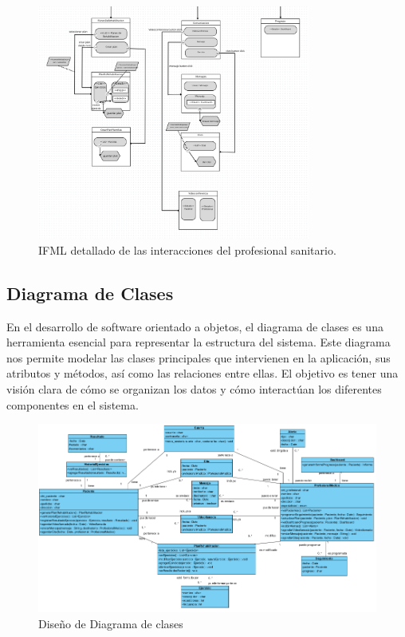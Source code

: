 \documentclass{article}
\begin{document}
\begin{figure}[H]
	\centering
	\includegraphics[width=0.8\textwidth]{images/ifml_profesional.png}
	\caption{IFML detallado de las interacciones del profesional sanitario.}
	\label{fig:ifml_profesional}
\end{figure}


\subsection{Diagrama de Clases}

En el desarrollo de software orientado a objetos, el diagrama de clases es una herramienta esencial para representar la estructura del sistema. Este diagrama nos permite modelar las clases principales que intervienen en la aplicación, sus atributos y métodos, así como las relaciones entre ellas. El objetivo es tener una visión clara de cómo se organizan los datos y cómo interactúan los diferentes componentes en el sistema. 

\begin{figure}
	\begin{center} 
		\includegraphics[width=1\textwidth]{images/diagrama_clases.png}
		\caption{Diseño de Diagrama de clases}
		\label{fig:DiagClases}
	\end{center}
\end{figure}
\vspace{5cm}
\end{document}
